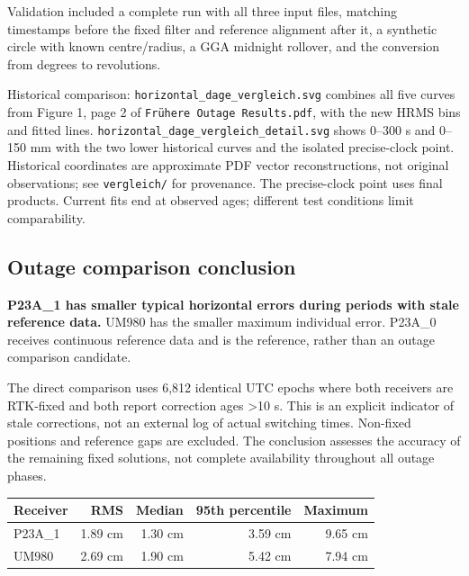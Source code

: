 \documentclass[11pt,a4paper]{article}
\begin{document}
Validation included a complete run with all three input files, matching timestamps before the fixed filter and reference alignment after it, a synthetic circle with known centre/radius, a GGA midnight rollover, and the conversion from degrees to revolutions.

Historical comparison: {\small\texttt{horizontal\_\allowbreak{}dage\_\allowbreak{}vergleich.svg}} combines all five curves from Figure 1, page 2 of {\small\texttt{Frühere Outage Results.pdf}}, with the new HRMS bins and fitted lines. {\small\texttt{horizontal\_\allowbreak{}dage\_\allowbreak{}vergleich\_\allowbreak{}detail.svg}} shows 0–300 s and 0–150 mm with the two lower historical curves and the isolated precise-clock point. Historical coordinates are approximate PDF vector reconstructions, not original observations; see {\small\texttt{vergleich/\allowbreak{}}} for provenance. The precise-clock point uses final products. Current fits end at observed ages; different test conditions limit comparability.

\subsection{Outage comparison conclusion}

\textbf{P23A\_1 has smaller typical horizontal errors during periods with stale reference data.} UM980 has the smaller maximum individual error. P23A\_0 receives continuous reference data and is the reference, rather than an outage comparison candidate.

The direct comparison uses 6,812 identical UTC epochs where both receivers are RTK-fixed and both report correction ages >10 s. This is an explicit indicator of stale corrections, not an external log of actual switching times. Non-fixed positions and reference gaps are excluded. The conclusion assesses the accuracy of the remaining fixed solutions, not complete availability throughout all outage phases.

\begin{center}\small\begin{tabular}{lrrrr}\toprule
Receiver & RMS & Median & 95th percentile & Maximum\\\midrule
P23A\_1 & 1.89 cm & 1.30 cm & 3.59 cm & 9.65 cm\\
UM980 & 2.69 cm & 1.90 cm & 5.42 cm & 7.94 cm\\
\bottomrule\end{tabular}\end{center}
\end{document}
